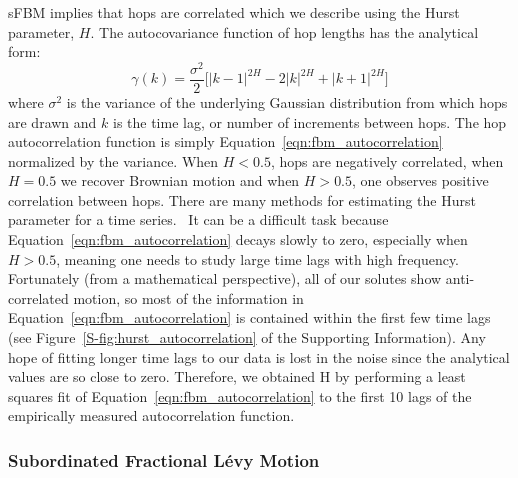 \documentclass{article}
\begin{document}
  sFBM implies that hops are correlated which we describe using the Hurst parameter, $H$. 
  The autocovariance function of hop lengths has the analytical form:~\cite{mandelbrot_fractional_1968}
  \begin{equation}
    \gamma(k) = \dfrac{\sigma^2}{2}\bigg[|k-1|^{2H} - 2|k|^{2H} + |k+1|^{2H}\bigg]
  \label{eqn:fbm_autocorrelation}
  \end{equation}
  where $\sigma^2$ is the variance of the underlying Gaussian distribution from which hops are
  drawn and $k$ is the time lag, or number of increments between hops. The hop autocorrelation
  function is simply Equation~\ref{eqn:fbm_autocorrelation} normalized by the variance. 
  When $H < 0.5$, hops are negatively correlated, when $H = 0.5$ we recover Brownian motion
  and when $H > 0.5$, one observes positive correlation between hops. There are many methods
  for estimating the Hurst parameter for a time series.~\cite{clegg_practical_2006} It can
  be a difficult task because Equation~\ref{eqn:fbm_autocorrelation} decays slowly to zero, 
  especially when $H > 0.5$, meaning one needs to study large time lags with high frequency.
  Fortunately (from a mathematical perspective), all of our solutes show anti-correlated motion, so most of the information in
  Equation~\ref{eqn:fbm_autocorrelation} is contained within the first few time lags (see 
  Figure~\ref{S-fig:hurst_autocorrelation} of the Supporting Information). Any hope of
  fitting longer time lags to our data is lost in the noise since the analytical values
  are so close to zero. Therefore, we obtained H by performing a least squares fit of 
  Equation~\ref{eqn:fbm_autocorrelation} to the first 10 lags of the empirically measured
  autocorrelation function.

  \subsubsection*{Subordinated Fractional L\'evy Motion}
\end{document}

